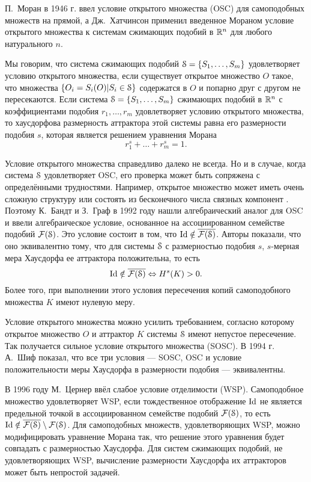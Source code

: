 П.~Моран в 1946 г. \cite{Moran1946} ввел условие открытого множества (OSC) для самоподобных множеств на прямой, а Дж.~Хатчинсон \cite{Hut1981} применил введенное Мораном условие открытого множества к системам сжимающих подобий в $\mathbb{R}^n$ для любого натурального $n$.

Мы говорим, что система сжимающих подобий ${\EuScript S}=\{S_1, \ldots, S_m\}$ удовлетворяет условию открытого множества, если существует открытое множество $O$ такое, что множества $\{O_i=S_i(O) | S_i\in{\EuScript S}\}$ содержатся в $O$ и попарно друг с другом не пересекаются.
Если система ${\EuScript S}=\{S_1,\ldots,S_m\}$ сжимающих подобий в $\mathbb{R}^n$ с коэффициентами подобия $r_1, \ldots, r_m$ удовлетворяет условию открытого множества, то хаусдорфова размерность аттрактора этой системы равна его размерности подобия $s$, которая является решением уравнения Морана 
$$r_1^s+\ldots+r_m^s=1.$$ 

Условие открытого множества справедливо далеко не всегда. Но и в случае, когда система ${\EuScript S}$ удовлетворяет OSC, его проверка может быть сопряжена с определёнными трудностями.
Например, открытое множество может иметь очень сложную структуру или состоять из бесконечного числа связных компонент \cite{AST2024}.
Поэтому К.~Бандт и З.~Граф в 1992 году \cite{SSS7} нашли алгебраический аналог для OSC и ввели алгебраическое условие, основанное на ассоциированном семействе подобий $\mathcal{F}({\EuScript S})$. 
Это условие состоит в том, что $\mathop{\rm Id} \nolimits\notin\overline{\mathcal{F}({\EuScript S})}$. Авторы показали, что оно эквивалентно тому, что для  системы ${\EuScript S}$ с размерностью подобия $s$, $s$-мерная мера Хаусдорфа  ее аттрактора положительна, то есть
$$\mathop{\rm Id} \nolimits\notin\overline{\mathcal{F}({\EuScript S})} \Leftrightarrow H^s(K)>0.$$
Более того, при выполнении этого условия пересечения копий самоподобного множества $K$ имеют нулевую меру.

Условие открытого множества можно усилить требованием, согласно которому открытое множество $O$ и аттрактор $K$ системы ${\EuScript S}$ имеют непустое пересечение. 
Так получается сильное условие открытого множества (SOSC).
В 1994 г. А.~Шиф \cite{Schief1994} показал, что все три условия --- SOSC, OSC и условие положительности меры Хаусдорфа в размерности подобия --- эквивалентны.

В 1996 году М.~Цернер \cite{Zerner1996} ввёл слабое условие отделимости (WSP).
Самоподобное множество удовлетворяет WSP, если тождественное отображение $\mathop{\rm Id} \nolimits$ не является предельной точкой в ассоциированном семействе подобий $\mathcal{F}({\EuScript S})$, то есть $\mathop{\rm Id} \nolimits\notin\overline{\mathcal{F}({\EuScript S})}\setminus\mathcal{F}({\EuScript S})$.
Для самоподобных множеств, удовлетворяющих WSP, можно модифицировать уравнение Морана так, что решение этого уравнения будет совпадать с размерностью Хаусдорфа.
Для систем сжимающих подобий, не удовлетворяющих WSP, вычисление размерности Хаусдорфа их аттракторов может быть  непростой задачей.


